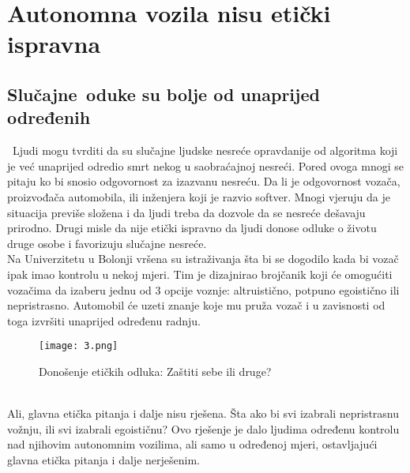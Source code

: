 \documentclass[a4paper]{article}
\begin{document}
{\section{Autonomna vozila nisu etički ispravna}
\label{sec:autonomna vozila nisu etički ispravna}
\subsection{Slučajne\, oduke su bolje od unaprijed određenih}
\label{subsec:slučajne oduke su bolje od unaprijed određenih}
\indent~Ljudi mogu tvrditi da su slučajne ljudske nesreće opravdanije od algoritma koji je već unaprijed odredio smrt nekog u saobraćajnoj nesreći. Pored ovoga mnogi se pitaju ko bi snosio odgovornost za izazvanu nesreću. Da li je odgovornost vozača, proizvođača automobila, ili inženjera koji je razvio softver. Mnogi vjeruju da je situacija previše složena i da ljudi treba da dozvole da se nesreće dešavaju prirodno. Drugi misle da nije etički ispravno da ljudi donose odluke o životu druge osobe i favorizuju slučajne nesreće.\\
\indent Na Univerzitetu u Bolonji vršena su istraživanja šta bi se dogodilo kada bi vozač ipak imao kontrolu u nekoj mjeri. Tim je dizajnirao brojčanik koji će omogućiti vozačima da izaberu jednu od 3 opcije voznje: altruistično, potpuno egoistično ili nepristrasno. Automobil će uzeti znanje koje mu pruža vozač i u zavisnosti od toga izvršiti unaprijed određenu radnju.\\
\begin{figure}[h!]
\begin{center}
\texttt{[image: 3.png]}
\label{3}
\caption{Donošenje etičkih odluka: Zaštiti sebe ili druge?}
\end{center}
\end{figure}\\
\indent  Ali, glavna etička pitanja i dalje nisu rješena. Šta ako bi svi izabrali nepristrasnu vožnju, ili svi izabrali egoističnu? Ovo rješenje je dalo ljudima određenu kontrolu nad njihovim autonomnim vozilima, ali samo u određenoj mjeri, ostavljajući glavna etička pitanja i dalje nerješenim.

}
\end{document}
